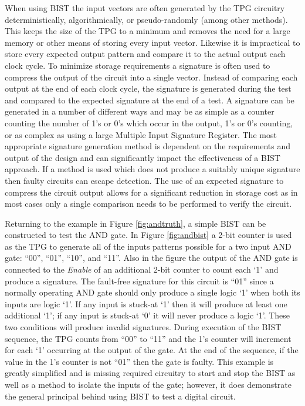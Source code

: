 \documentclass[12pt]{report}
\begin{document}
When using BIST the input vectors are often generated by the TPG circuitry deterministically, algorithmically, or pseudo-randomly (among other methods)\cite{stroud}.  This keeps the size of the TPG to a minimum and removes the need for a large memory or other means of storing every input vector.  Likewise it is impractical to store every expected output pattern and compare it to the actual output each clock cycle.  To minimize storage requirements a signature is often used to compress the output of the circuit into a single vector.  Instead of comparing each output at the end of each clock cycle, the signature is generated during the test and compared to the expected signature at the end of a test\cite{stroud}\cite{faultdiagnosis}.  A signature can be generated in a number of different ways and may be as simple as a counter counting the number of 1's or 0's which occur in the output, 1's or 0's counting, or as complex as using a large Multiple Input Signature Register\cite{stroud}.  The most appropriate signature generation method is dependent on the requirements and output of the design and can significantly impact the effectiveness of a BIST approach.  If a method is used which does not produce a suitably unique signature then faulty circuits can escape detection\cite{stroud}\cite{faultdiagnosis}.  The use of an expected signature to compress the circuit output allows for a significant reduction in storage cost as in most cases only a single comparison needs to be performed to verify the circuit\cite{faultdiagnosis}.

Returning to the example in Figure \ref{fig:andtruth}, a simple BIST can be constructed to test the AND gate.  In Figure \ref{fig:andbist} a 2-bit counter is used as the TPG to generate all of the inputs patterns possible for a two input AND gate: ``00'', ``01'', ``10'', and ``11''.  Also in the figure the output of the AND gate is connected to the \textit{Enable} of an additional 2-bit counter to count each `1' and produce a signature.  The fault-free signature for this circuit is ``01'' since a normally operating AND gate should only produce a single logic `1' when both its inputs are logic `1'.  If any input is stuck-at `1' then it will produce at least one additional `1'; if any input is stuck-at `0' it will never produce a logic `1'.  These two conditions will produce invalid signatures.  During execution of the BIST sequence, the TPG counts from ``00'' to ``11'' and the 1's counter will increment for each `1' occurring at the output of the gate.  At the end of the sequence, if the value in the 1's counter is not ``01'' then the gate is faulty.  This example is greatly simplified and is missing required circuitry to start and stop the BIST as well as a method to isolate the inputs of the gate; however, it does demonstrate the general principal behind using BIST to test a digital circuit.
\end{document}
